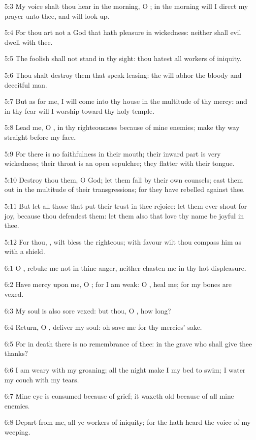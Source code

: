 5:3 My voice shalt thou hear in the morning, O \LORD; in the morning
will I direct my prayer unto thee, and will look up.

5:4 For thou art not a God that hath pleasure in wickedness: neither
shall evil dwell with thee.

5:5 The foolish shall not stand in thy sight: thou hatest all workers
of iniquity.

5:6 Thou shalt destroy them that speak leasing: the \LORD will abhor
the bloody and deceitful man.

5:7 But as for me, I will come into thy house in the multitude of thy
mercy: and in thy fear will I worship toward thy holy temple.

5:8 Lead me, O \LORD, in thy righteousness because of mine enemies;
make thy way straight before my face.

5:9 For there is no faithfulness in their mouth; their inward part is
very wickedness; their throat is an open sepulchre; they flatter with
their tongue.

5:10 Destroy thou them, O God; let them fall by their own counsels;
cast them out in the multitude of their transgressions; for they have
rebelled against thee.

5:11 But let all those that put their trust in thee rejoice: let them
ever shout for joy, because thou defendest them: let them also that
love thy name be joyful in thee.

5:12 For thou, \LORD, wilt bless the righteous; with favour wilt thou
compass him as with a shield.



6:1 O \LORD, rebuke me not in thine anger, neither chasten me in thy
hot displeasure.

6:2 Have mercy upon me, O \LORD; for I am weak: O \LORD, heal me; for my
bones are vexed.

6:3 My soul is also sore vexed: but thou, O \LORD, how long?

6:4 Return, O \LORD, deliver my soul: oh save me for thy mercies' sake.

6:5 For in death there is no remembrance of thee: in the grave who
shall give thee thanks?

6:6 I am weary with my groaning; all the night make I my bed to swim;
I water my couch with my tears.

6:7 Mine eye is consumed because of grief; it waxeth old because of
all mine enemies.

6:8 Depart from me, all ye workers of iniquity; for the \LORD hath
heard the voice of my weeping.


